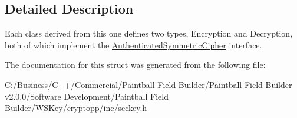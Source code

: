 \subsection{Detailed Description}
Each class derived from this one defines two types, Encryption and Decryption, both of which implement the \hyperlink{class_authenticated_symmetric_cipher}{AuthenticatedSymmetricCipher} interface. 

The documentation for this struct was generated from the following file:\begin{DoxyCompactItemize}
\item 
C:/Business/C++/Commercial/Paintball Field Builder/Paintball Field Builder v2.0.0/Software Development/Paintball Field Builder/WSKey/cryptopp/inc/seckey.h\end{DoxyCompactItemize}

